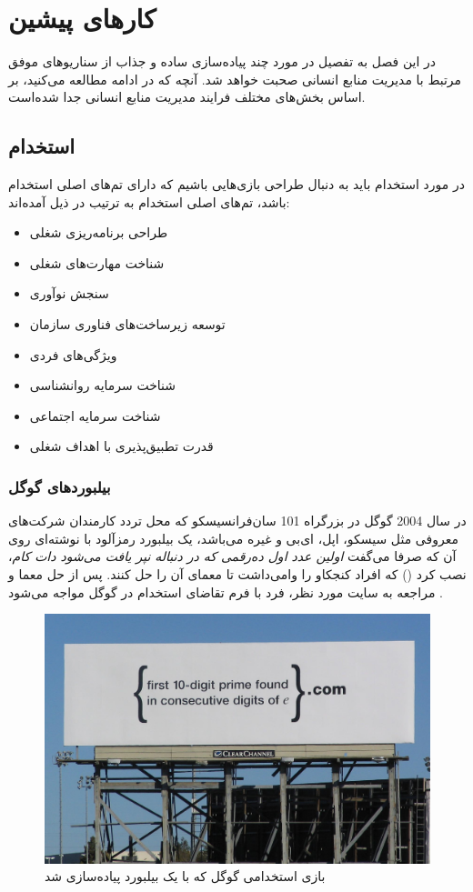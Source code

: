 \chapter{کارهای پیشین}
در این فصل به تفصیل در مورد چند پیاده‌سازی ساده و جذاب از سناریوهای موفق مرتبط با مدیریت منابع انسانی صحبت خواهد شد. آنچه که در ادامه مطالعه می‌کنید، بر اساس بخش‌های مختلف فرایند مدیریت منابع انسانی جدا شده‌است.
\section{استخدام}
در مورد استخدام باید به دنبال طراحی بازی‌هایی باشیم که دارای تم‌های اصلی استخدام باشد، تم‌های اصلی استخدام به ترتیب در ذیل آمده‌اند:
\begin{itemize}
	\item طراحی برنامه‌ریزی شغلی
	\item شناخت مهارت‌های شغلی
	\item سنجش نوآوری
	\item توسعه زیرساخت‌های فناوری سازمان
	\item ویژگی‌های فردی
	\item شناخت سرمایه روانشناسی
	\item شناخت سرمایه اجتماعی
	\item قدرت تطبیق‌پذیری با اهداف شغلی
\end{itemize}
\subsection{بیلبوردهای گوگل}
در سال 2004 گوگل در بزرگراه 101 سان‌فرانسیسکو که محل تردد کارمندان شرکت‌های معروفی مثل سیسکو، اپل، ای‌بی و غیره می‌باشد، یک بیلبورد رمزآلود با نوشته‌ای روی آن که صرفا می‌گفت \textit{اولین عدد اول ده‌رقمی که در دنباله نپر یافت می‌شود دات کام}، نصب کرد () که افراد کنجکاو را وامی‌داشت تا معمای آن را حل کنند. پس از حل معما و مراجعه به سایت مورد نظر، فرد با فرم تقاضای استخدام در گوگل مواجه می‌شود \cite{eprimesolve}.

\begin{figure}[!htb]
	\centering
	\includegraphics[width=\textwidth]{Figures/eprime.jpg}
	\caption{بازی استخدامی گوگل که با یک بیلبورد پیاده‌سازی شد \cite{eprimepic}}
	\label{fig:google}
\end{figure}


